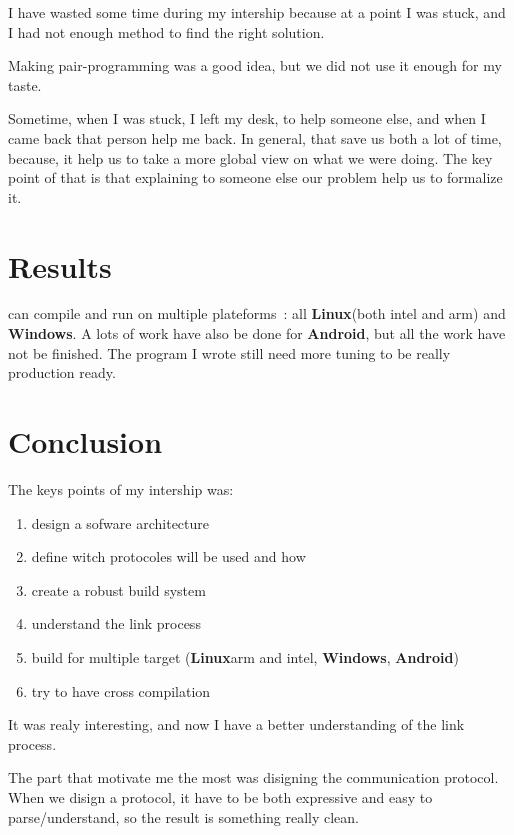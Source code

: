 \documentclass[a4paper,11pt]{custom}
\newcommand{\linux}{\textbf{Linux}}
\newcommand{\win}{\textbf{Windows}}
\newcommand{\android}{\textbf{Android}}
\begin{document}
I have wasted some time during my intership because at a point I was stuck, and
I had not enough method to find the right solution.

Making pair-programming was a good idea, but we did not use it enough for my
taste.

Sometime, when I was stuck, I left my desk, to help someone else, and when I
came back that person help me back. In general, that save us both a lot of time,
because, it help us to take a more global view on what we were doing. The key
point of that is that explaining to someone else our problem help us to
formalize it.

\chapter{Results}

can compile and run on multiple plateforms~: all \linux (both intel and arm) and
\win. A lots of work have also be done for \android, but all the work have
not be finished.
The program I wrote still need more tuning to be really production ready.



\chapter{Conclusion}

The keys points of my intership was:
\begin{enumerate}
\item design a sofware architecture
\item define witch protocoles will be used and how
\item create a robust build system
\item understand the link process
\item build for multiple target (\linux arm and intel, \win, \android)
\item try to have cross compilation
\end{enumerate}

It was realy interesting, and now I have a better understanding of the link
process.

The part that motivate me the most was disigning the communication protocol.
When we disign a protocol, it have to be both expressive and easy to
parse/understand, so the result is something really clean.
\end{document}
